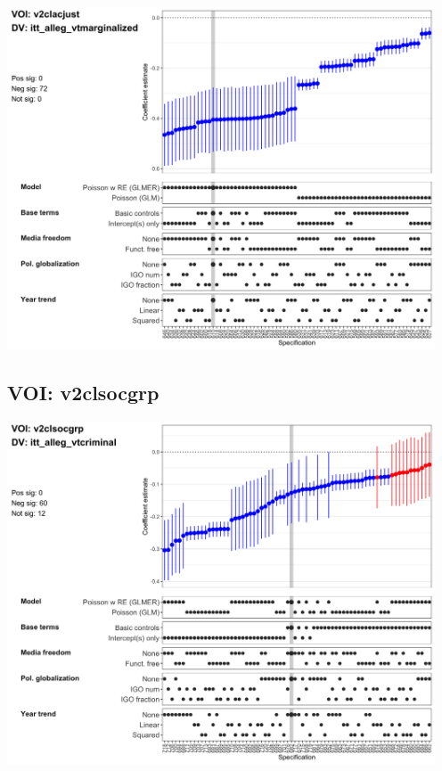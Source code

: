 \documentclass[]{article}
\begin{document}
\includegraphics[height=4in]{../output/figures-robustness/specplot-v2clacjust-itt_alleg_vtmarginalized.png}

\hypertarget{voi-v2clsocgrp}{%
\subsection{VOI: v2clsocgrp}\label{voi-v2clsocgrp}}

\includegraphics[height=4in]{../output/figures-robustness/specplot-v2clsocgrp-itt_alleg_vtcriminal.png}
\end{document}
